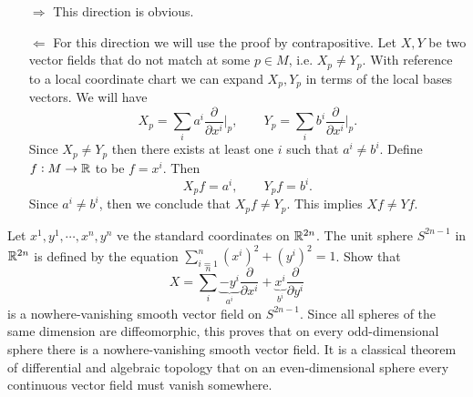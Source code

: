 \begin{solution}
	$ \ $
	\begin{itemize}
		\item[$\boxed{\Longrightarrow}$] This direction is obvious.
		\item[$\boxed{\Longleftarrow}$] For this direction we will use the proof by contrapositive. Let $ X, Y $ be two vector fields that do not match at some $ p \in M $, i.e. $ X_p \neq Y_p $. With reference to a local coordinate chart we can expand $ X_p, Y_p $ in terms of the local bases vectors. We will have
		\[ X_p = \sum_i a^i \frac{\partial}{\partial  x^i}\big|_{p}, \qquad Y_p = \sum_i b^i\frac{\partial}{\partial  x^i}\big|_{p}. \]
		Since $ X_p \neq Y_p $ then there exists at least one $ i $ such that $ a^i \neq b^i $. Define $ f:M \to \mathbb{R} $ to be $ f = x^i $. Then 
		\[ X_pf = a^i, \qquad Y_pf = b^i. \]
		Since $ a^i \neq b^i$, then we conclude that $ X_pf \neq Y_p $. This implies $ Xf \neq Yf $.
	\end{itemize}
\end{solution}

\begin{problem}
	Let $ x^1,y^1,\cdots,x^n,y^n $ ve the standard coordinates on $ \mathbb{R}^{2n} $. The unit sphere $ S^{2n-1} $ in $ \mathbb{R}^{2n} $ is defined by the equation $ \sum_{i=1}^n (x^i)^2 + (y^i)^2  = 1$. Show that 
	\[ X = \sum_{i}^{n} \underbrace{-y^i}_{a^i} \frac{\partial}{\partial  x^i} + \underbrace{x^i}_{b^i} \frac{\partial }{\partial y^i} \]
	is a nowhere-vanishing smooth vector field on $ S^{2n-1} $. Since all spheres of the same dimension are diffeomorphic, this proves that on every odd-dimensional sphere there is a nowhere-vanishing smooth vector field. It is a classical theorem of differential and algebraic topology that on an even-dimensional sphere every continuous vector field must vanish somewhere.
\end{problem}

